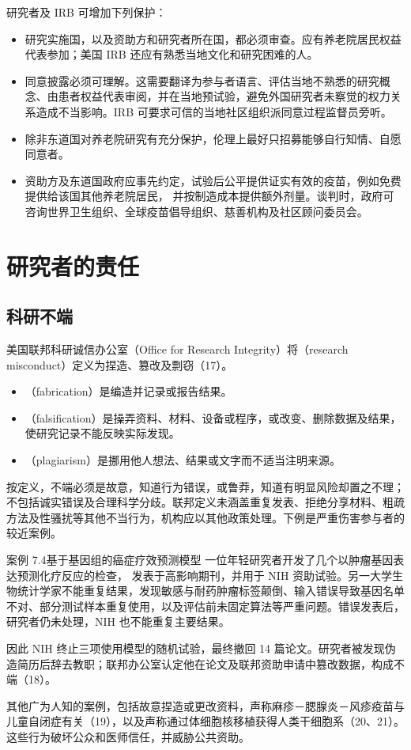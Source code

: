 研究者及 IRB 可增加下列保护：
\begin{itemize}
\item 研究实施国，以及资助方和研究者所在国，都必须审查。应有养老院居民权益代表参加；美国 IRB 还应有熟悉当地文化和研究困难的人。
\item 同意披露必须可理解。这需要翻译为参与者语言、评估当地不熟悉的研究概念、由患者权益代表审阅，并在当地预试验，避免外国研究者未察觉的权力关系造成不当影响。IRB 可要求可信的当地社区组织派同意过程监督员旁听。
\item 除非东道国对养老院研究有充分保护，伦理上最好只招募能够自行知情、自愿同意者。
\item 资助方及东道国政府应事先约定，试验后公平提供证实有效的疫苗，例如免费提供给该国其他养老院居民，
并按制造成本提供额外剂量。谈判时，政府可咨询世界卫生组织、全球疫苗倡导组织、慈善机构及社区顾问委员会。
\end{itemize}

\section{研究者的责任}
\subsection{科研不端}
美国联邦科研诚信办公室（Office for Research Integrity）将（research misconduct）定义为捏造、篡改及剽窃（17）。
\begin{itemize}
\item {}（fabrication）是编造并记录或报告结果。
\item {}（falsification）是操弄资料、材料、设备或程序，或改变、删除数据及结果，使研究记录不能反映实际发现。
\item {}（plagiarism）是挪用他人想法、结果或文字而不适当注明来源。
\end{itemize}
按定义，不端必须是故意，知道行为错误，或鲁莽，知道有明显风险却置之不理；不包括诚实错误及合理科学分歧。联邦定义未涵盖重复发表、拒绝分享材料、粗疏方法及性骚扰等其他不当行为，机构应以其他政策处理。下例是严重伤害参与者的较近案例。
\begin{bookbox}{案例 7.4\quad 基于基因组的癌症疗效预测模型}
一位年轻研究者开发了几个以肿瘤基因表达预测化疗反应的检查，
发表于高影响期刊，并用于 NIH 资助试验。另一大学生物统计学家不能重复结果，发现敏感与耐药肿瘤标签颠倒、输入错误导致基因名单不对、部分测试样本重复使用，以及评估前未固定算法等严重问题。错误发表后，研究者仍未处理，NIH 也不能重复主要结果。

因此 NIH 终止三项使用模型的随机试验，最终撤回 14 篇论文。研究者被发现伪造简历后辞去教职；联邦办公室认定他在论文及联邦资助申请中篡改数据，构成不端（18）。
\end{bookbox}
其他广为人知的案例，包括故意捏造或更改资料，声称麻疹－腮腺炎－风疹疫苗与儿童自闭症有关（19），以及声称通过体细胞核移植获得人类干细胞系（20、21）。这些行为破坏公众和医师信任，并威胁公共资助。

